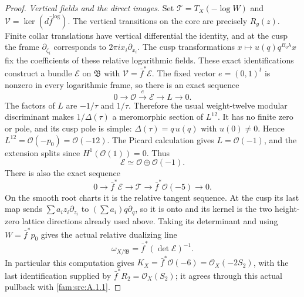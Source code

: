 \begin{proof}
\emph{Vertical fields and the direct images.}
Set $\mathcal T=T_X(-\log W)$ and
$\mathcal V=\ker(d\bar f^{\log})$.
The vertical transitions on the core are precisely $R_g(z)$.
Finite collar translations have vertical differential the identity,
and at the cusp the frame $\partial_{\zeta_i}$ corresponds to
$2\pi i x_i\partial_{x_i}$. The cusp transformations
$x\mapsto u(q)q^{B_0\lambda}x$ fix the coefficients of these
relative logarithmic fields. These exact identifications construct
a bundle $\mathcal E$ on $\mathfrak B$ with
$\mathcal V=\bar f^*\mathcal E$.
The fixed vector $e=(0,1)^t$ is nonzero in every logarithmic frame,
so there is an exact sequence
\[
 0\longrightarrow\mathcal O\xrightarrow{e}\mathcal E
 \longrightarrow L\longrightarrow0.
\]
The factors of $L$ are $-1/\tau$ and $1/\tau$. Therefore the usual
weight-twelve modular discriminant makes $1/\Delta(\tau)$ a
meromorphic section of $L^{12}$. It has no finite zero or pole,
and its cusp pole is simple: $\Delta(\tau)=q\,u(q)$ with
$u(0)\ne0$. Hence $L^{12}=\mathcal O(-p_0)=\mathcal O(-12)$.
The Picard calculation gives $L=\mathcal O(-1)$, and the extension
splits since $H^1(\mathcal O(1))=0$. Thus
\[
 \mathcal E\simeq\mathcal O\oplus\mathcal O(-1).
\]
There is also the exact sequence
\begin{equation}\label{fam:eq:ab-log-tangent}
 0\longrightarrow\bar f^*\mathcal E\longrightarrow\mathcal T
 \longrightarrow\bar f^*\mathcal O(-5)\longrightarrow0.
\end{equation}
On the smooth root charts it is the relative tangent sequence. At the
cusp its last map sends $\sum a_i z_i\partial_{z_i}$ to
$(\sum a_i)q\partial_q$, so it is onto and its kernel is the
two height-zero lattice directions already used above. Taking its
determinant and using $W=\bar f^*p_0$ gives the actual relative
dualizing line
\begin{equation}\label{fam:eq:ab-relative-dualizing}
 \omega_{X/\mathfrak B}=\bar f^*(\det\mathcal E)^{-1}.
\end{equation}
In particular this computation gives
$K_X=\bar f^*\mathcal O(-6)=\mathcal O_X(-2S_2)$, with the last
identification supplied by $\bar f^*R_2=\mathcal O_X(S_2)$;
it agrees through this actual pullback with \ref{fam:src:A.1.1}.


\end{proof}
